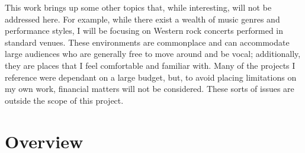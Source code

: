 This work brings up some other topics that, while interesting, will not be addressed here. For example, while there exist a wealth of music genres and performance styles, I will be focusing on Western rock concerts performed in standard venues. These environments are commonplace and can accommodate large audiences who are generally free to move around and be vocal; additionally, they are places that I feel comfortable and familiar with. Many of the projects I reference were dependant on a large budget, but, to avoid placing limitations on my own work, financial matters will not be considered. These sorts of issues are outside the scope of this project.


\section{Overview}

